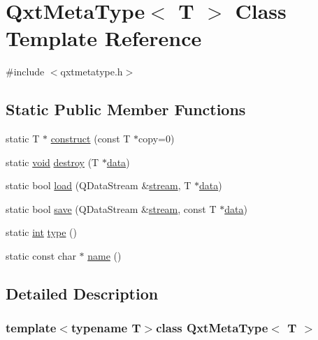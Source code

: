 \hypertarget{class_qxt_meta_type}{\section{Qxt\-Meta\-Type$<$ T $>$ Class Template Reference}
\label{class_qxt_meta_type}
}


{\ttfamily \#include $<$qxtmetatype.\-h$>$}

\subsection*{Static Public Member Functions}
\begin{DoxyCompactItemize}
\item 
static T $\ast$ \hyperlink{class_qxt_meta_type_a5ba8903c0821e8d5586bdf9879a827c5}{construct} (const T $\ast$copy=0)
\item 
static \hyperlink{group___u_a_v_objects_plugin_ga444cf2ff3f0ecbe028adce838d373f5c}{void} \hyperlink{class_qxt_meta_type_a25cc9b73a5832db179c60901a08186ab}{destroy} (T $\ast$\hyperlink{glext_8h_a8850df0785e6fbcc2351af3b686b8c7a}{data})
\item 
static bool \hyperlink{class_qxt_meta_type_a1c9e70020672cc8422e626343877cd40}{load} (Q\-Data\-Stream \&\hyperlink{ioapi_8h_a4ed0a20697a8c37f8af699a8ec6d76a8}{stream}, T $\ast$\hyperlink{glext_8h_a8850df0785e6fbcc2351af3b686b8c7a}{data})
\item 
static bool \hyperlink{class_qxt_meta_type_aa5ca13fef6b2051150eb4f4a741f9b10}{save} (Q\-Data\-Stream \&\hyperlink{ioapi_8h_a4ed0a20697a8c37f8af699a8ec6d76a8}{stream}, const T $\ast$\hyperlink{glext_8h_a8850df0785e6fbcc2351af3b686b8c7a}{data})
\item 
static \hyperlink{ioapi_8h_a787fa3cf048117ba7123753c1e74fcd6}{int} \hyperlink{class_qxt_meta_type_a952bd56ca12209265c9861df1f8a1451}{type} ()
\item 
static const char $\ast$ \hyperlink{class_qxt_meta_type_a808590640b9232f22b1b915ad7f2f757}{name} ()
\end{DoxyCompactItemize}


\subsection{Detailed Description}
\subsubsection*{template$<$typename T$>$class Qxt\-Meta\-Type$<$ T $>$}



